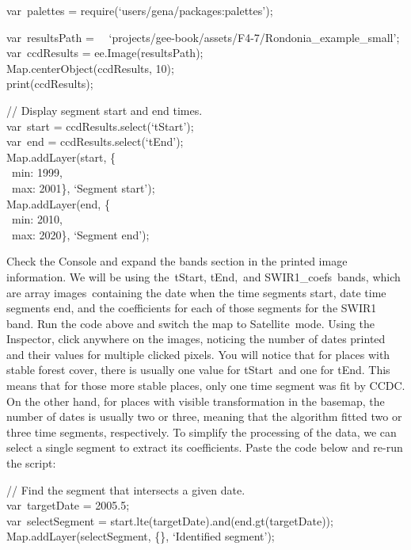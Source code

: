 \documentclass[
  letterpaper,
  DIV=11,
  numbers=noendperiod]{scrreprt}
\begin{document}
var~palettes = require(`users/gena/packages:palettes');

var~resultsPath =~
~`projects/gee-book/assets/F4-7/Rondonia\_example\_small';\\
var~ccdResults = ee.Image(resultsPath);\\
Map.centerObject(ccdResults, 10);\\
print(ccdResults);

// Display segment start and end times.\\
var~start = ccdResults.select(`tStart');\\
var~end = ccdResults.select(`tEnd');\\
Map.addLayer(start, \{\\
\hspace*{0.333em} ~min: 1999,\\
\hspace*{0.333em} ~max: 2001\}, `Segment start');\\
Map.addLayer(end, \{\\
\hspace*{0.333em} ~min: 2010,\\
\hspace*{0.333em} ~max: 2020\}, `Segment end');

Check the Console and expand the bands section in the printed image
information. We will be using the~tStart, tEnd,~and SWIR1\_coefs~bands,
which are array images~containing the date when the time segments start,
date time segments end, and the coefficients for each of those segments
for the SWIR1 band. Run the code above and switch the map to
Satellite~mode. Using the Inspector, click anywhere on the images,
noticing the number of dates printed and their values for multiple
clicked pixels. You will notice that for places with stable forest
cover, there is usually one value for tStart~and one for tEnd. This
means that for those more stable places, only one time segment was fit
by CCDC. On the other hand, for places with visible transformation in
the basemap, the number of dates is usually two or three, meaning that
the algorithm fitted two or three time segments, respectively. To
simplify the processing of the data, we can select a single segment to
extract its coefficients. Paste the code below and re-run the script:

// Find the segment that intersects a given date.\\
var~targetDate = 2005.5;\\
var~selectSegment = start.lte(targetDate).and(end.gt(targetDate));\\
Map.addLayer(selectSegment, \{\}, `Identified segment');
\end{document}

